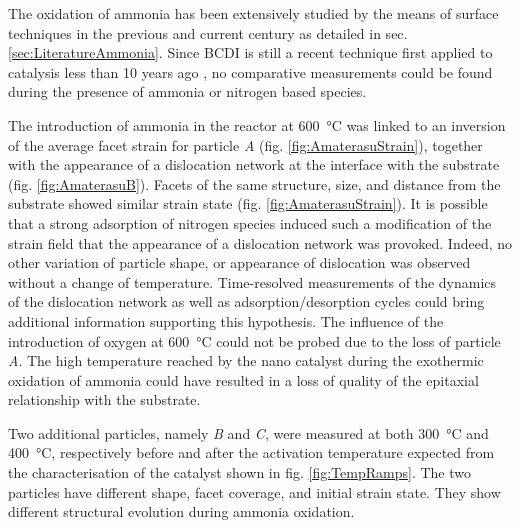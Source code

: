 The oxidation of ammonia has been extensively studied by the means of surface techniques in the previous and current century as detailed in sec. \ref{sec:LiteratureAmmonia}.
Since BCDI is still a recent technique first applied to catalysis less than 10 years ago \parencite{Ulvestad2016}, no comparative measurements could be found during the presence of ammonia or nitrogen based species.

The introduction of ammonia in the reactor at \qty{600}{\degreeCelsius} was linked to an inversion of the average facet strain for particle \textit{A} (fig. \ref{fig:AmaterasuStrain}), together with the appearance of a dislocation network at the interface with the substrate (fig. \ref{fig:AmaterasuB}).
Facets of the same structure, size, and distance from the substrate showed similar strain state (fig. \ref{fig:AmaterasuStrain}).
It is possible that a strong adsorption of nitrogen species induced such a modification of the strain field that the appearance of a dislocation network was provoked.
Indeed, no other variation of particle shape, or appearance of dislocation was observed without a change of temperature.
Time-resolved measurements of the dynamics of the dislocation network as well as adsorption/desorption cycles could bring additional information supporting this hypothesis.
The influence of the introduction of oxygen at \qty{600}{\degreeCelsius} could not be probed due to the loss of particle \textit{A}.
The high temperature reached by the nano catalyst during the exothermic oxidation of ammonia \parencite{Hatscher2008} could have resulted in a loss of quality of the epitaxial relationship with the substrate.

Two additional particles, namely \textit{B} and \textit{C}, were measured at both \qty{300}{\degreeCelsius} and \qty{400}{\degreeCelsius}, respectively before and after the activation temperature expected from the characterisation of the catalyst shown in fig. \ref{fig:TempRamps}.
The two particles have different shape, facet coverage, and initial strain state.
They show different structural evolution during ammonia oxidation.

